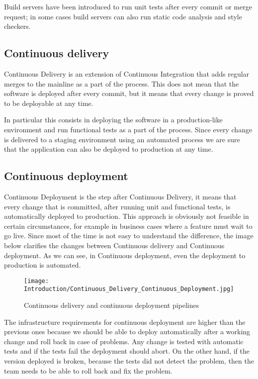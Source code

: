 Build servers have been introduced to run unit tests after every commit or
merge request; in some cases build servers can also run static code
analysis and style checkers.

\subsection{Continuous delivery}

Continuous Delivery is an extension of Continuous Integration that adds regular
merges to the mainline as a part of the process. This does not mean that the
software is deployed after every commit, but it means that every change is
proved to be deployable at any time.

In particular this consists in deploying the software in a production-like
environment and run functional tests as a part of the process. Since every
change is delivered to a staging environment using an automated process we are
sure that the application can also be deployed to production at any time.

\subsection{Continuous deployment}

Continuous Deployment is the step after Continuous Delivery, it means that
every change that is committed, after running unit and functional tests, is
automatically deployed to production. This approach is obviously not feasible
in certain circumstances, for example in business cases where a feature
must wait to go live. Since most of the time is not easy to understand the
difference, the image below clarifies the changes between Continuous
delivery and Continuous deployment. As we can see, in Continuous
deployment, even the deployment to production is automated.

\begin{figure}[H]
\texttt{[image: Introduction/Continuous\_Delivery\_Continuous\_Deployment.jpg]}
\caption{Continuous delivery and continuous deployment pipelines}
\end{figure}

The infrastructure requirements for continuous deployment are higher than
the previous ones because we should be able to deploy automatically after
a working change and roll back in case of problems. Any change is tested
with automatic tests and if the tests fail the deployment should abort. On
the other hand, if the version deployed is broken, because the tests did
not detect the problem, then the team needs to be able to roll back and
fix the problem.
